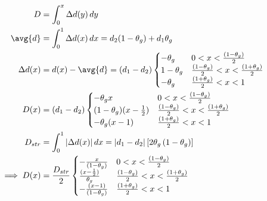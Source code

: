 \begin{equation}
\begin{split}
D &= \int_{0}^{x} \Delta d(y) \, dy\\
\avg{d} &= \int_{0}^{1} \Delta d(x) \,dx = d_{2}(1-\theta_g) + d_{1}\theta_g\\
\Delta d(x)&= d(x) - \avg{d} = \left(d_{1}-d_{2}\right) 
\begin{cases} -\theta_g & 0 < x < \frac{(1- \theta_{g})}{2} \\
1-\theta_g & \frac{(1- \theta_{g})}{2} < x < \frac{(1+ \theta_{g})}{2}  \\
-\theta_g &  \frac{(1+ \theta_{g})}{2}  < x < 1\end{cases}\\
D(x) &= \left(d_{1}-d_{2}\right) \begin{cases} -\theta_g x & 0 < x < \frac{(1- \theta_{g})}{2} \\
(1-\theta_g) (x-\frac{1}{2}) & \frac{(1- \theta_{g})}{2} < x < \frac{(1+ \theta_{g})}{2}  \\
-\theta_g (x-1) &  \frac{(1+ \theta_{g})}{2}  < x < 1\end{cases}\\
D_{str} &= \int_{0}^{1} |\Delta d(x)| \, dx = |d_{1} - d_{2}|\left[2\theta_g\left(1-\theta_g\right)\right]\\
\implies D(x) &= \frac{D_{str}}{2}  \begin{cases} - \frac{x}{(1- \theta_{g})} & 0 < x < \frac{(1- \theta_{g})}{2} \\
\frac{(x-\frac{1}{2})}{\theta_g}  & \frac{(1- \theta_{g})}{2} < x < \frac{(1+ \theta_{g})}{2}  \\
- \frac{(x-1)}{(1- \theta_{g})} &  \frac{(1+ \theta_{g})}{2}  < x < 1\end{cases}\\
\end{split}
\end{equation}

